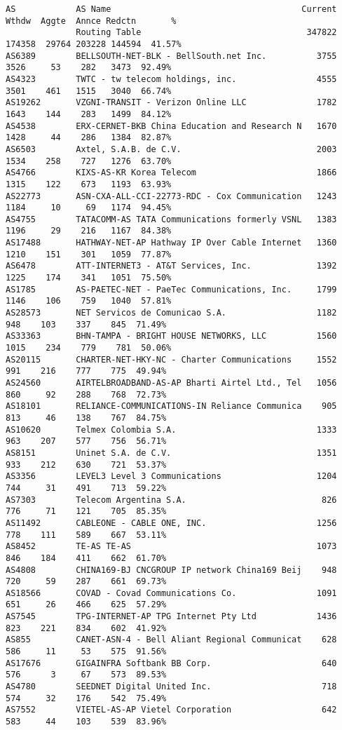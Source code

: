 \begin{lstlisting}[frame=trl]
AS            AS Name                                      Current  Wthdw  Aggte  Annce Redctn       %
              Routing Table                                 347822 174358  29764 203228 144594  41.57%
AS6389        BELLSOUTH-NET-BLK - BellSouth.net Inc.          3755   3526     53    282   3473  92.49%
AS4323        TWTC - tw telecom holdings, inc.                4555   3501    461   1515   3040  66.74%
AS19262       VZGNI-TRANSIT - Verizon Online LLC              1782   1643    144    283   1499  84.12%
AS4538        ERX-CERNET-BKB China Education and Research N   1670   1428     44    286   1384  82.87%
AS6503        Axtel, S.A.B. de C.V.                           2003   1534    258    727   1276  63.70%
AS4766        KIXS-AS-KR Korea Telecom                        1866   1315    122    673   1193  63.93%
AS22773       ASN-CXA-ALL-CCI-22773-RDC - Cox Communication   1243   1184     10     69   1174  94.45%
AS4755        TATACOMM-AS TATA Communications formerly VSNL   1383   1196     29    216   1167  84.38%
AS17488       HATHWAY-NET-AP Hathway IP Over Cable Internet   1360   1210    151    301   1059  77.87%
AS6478        ATT-INTERNET3 - AT&T Services, Inc.             1392   1225    174    341   1051  75.50%
AS1785        AS-PAETEC-NET - PaeTec Communications, Inc.     1799   1146    106    759   1040  57.81%
AS28573       NET Servicos de Comunicao S.A.                  1182    948    103    337    845  71.49%
AS33363       BHN-TAMPA - BRIGHT HOUSE NETWORKS, LLC          1560   1015    234    779    781  50.06%
AS20115       CHARTER-NET-HKY-NC - Charter Communications     1552    991    216    777    775  49.94%
AS24560       AIRTELBROADBAND-AS-AP Bharti Airtel Ltd., Tel   1056    860     92    288    768  72.73%
AS18101       RELIANCE-COMMUNICATIONS-IN Reliance Communica    905    813     46    138    767  84.75%
AS10620       Telmex Colombia S.A.                            1333    963    207    577    756  56.71%
AS8151        Uninet S.A. de C.V.                             1351    933    212    630    721  53.37%
AS3356        LEVEL3 Level 3 Communications                   1204    744     31    491    713  59.22%
AS7303        Telecom Argentina S.A.                           826    776     71    121    705  85.35%
AS11492       CABLEONE - CABLE ONE, INC.                      1256    778    111    589    667  53.11%
AS8452        TE-AS TE-AS                                     1073    846    184    411    662  61.70%
AS4808        CHINA169-BJ CNCGROUP IP network China169 Beij    948    720     59    287    661  69.73%
AS18566       COVAD - Covad Communications Co.                1091    651     26    466    625  57.29%
AS7545        TPG-INTERNET-AP TPG Internet Pty Ltd            1436    823    221    834    602  41.92%
AS855         CANET-ASN-4 - Bell Aliant Regional Communicat    628    586     11     53    575  91.56%
AS17676       GIGAINFRA Softbank BB Corp.                      640    576      3     67    573  89.53%
AS4780        SEEDNET Digital United Inc.                      718    574     32    176    542  75.49%
AS7552        VIETEL-AS-AP Vietel Corporation                  642    583     44    103    539  83.96%
\end{lstlisting}
